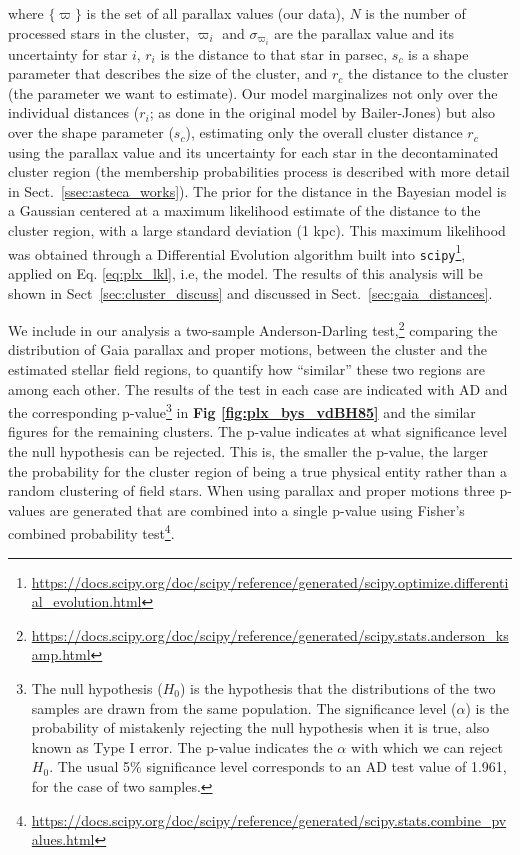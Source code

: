 \documentclass[draft]{aa}
\begin{document}
\noindent where $\{\varpi\}$ is the set of all parallax values (our
data), $N$ is the number of processed stars in the cluster,
$\varpi_{i}$ and $\sigma_{\varpi_{i}}$ are the parallax value and its
uncertainty for star $i$, $r_{i}$ is the distance to that star in parsec,
$s_{c}$ is a shape parameter that describes the size of the cluster, and
$r_{c}$ the distance to the cluster (the parameter we want to estimate).
%
Our model marginalizes not only over the individual distances ($r_i$;
as done in the original model by Bailer-Jones) but also
over the shape parameter ($s_c$), estimating only the overall cluster distance
$r_c$ using the parallax value and its uncertainty for each star in the
decontaminated cluster region (the membership probabilities process is
described with more detail in Sect.~\ref{ssec:asteca_works}).
%
The prior for the distance in the Bayesian model is a Gaussian centered at a
maximum likelihood estimate of the distance to the cluster region, with a large
standard deviation (1 kpc). This maximum likelihood was
obtained through a Differential Evolution algorithm built into
\texttt{scipy}\footnote{\url{https://docs.scipy.org/doc/scipy/reference/generated/scipy.optimize.differential_evolution.html}},
applied on Eq. \ref{eq:plx_lkl}, i.e, the model.
%
The results of this analysis will be shown in Sect~\ref{sec:cluster_discuss}
and discussed in Sect.~\ref{sec:gaia_distances}.

We include in our analysis a two-sample Anderson-Darling
test,\footnote{\url{https://docs.scipy.org/doc/scipy/reference/generated/scipy.stats.anderson_ksamp.html}}
comparing the distribution of Gaia parallax and proper motions,
between the cluster and the estimated stellar field regions, to quantify how
``similar'' these two regions are among each other.
The results of the test in each case are indicated with AD and the
corresponding p-value\footnote{The null hypothesis ($H_{0}$) is the
hypothesis that the distributions of the two samples are drawn from the same
population. The significance level ($\alpha$) is the probability of mistakenly
rejecting the null hypothesis when it is true, also known as Type I error. The
p-value indicates the $\alpha$ with which we can reject $H_{0}$. The usual 5\%
significance level corresponds to an AD test value of 1.961, for the case of two
samples.} in \textbf{Fig \ref{fig:plx_bys_vdBH85} }and the similar figures for
the remaining clusters.
The p-value indicates at what significance level the null hypothesis
can be rejected. This is, the smaller the p-value, the larger the probability
for the cluster region of being a true physical entity rather than a random
clustering of field stars. When using parallax and proper motions three
p-values are generated that are combined into a single p-value using Fisher's
combined probability
test\footnote{\url{https://docs.scipy.org/doc/scipy/reference/generated/scipy.stats.combine_pvalues.html}}.
\end{document}
